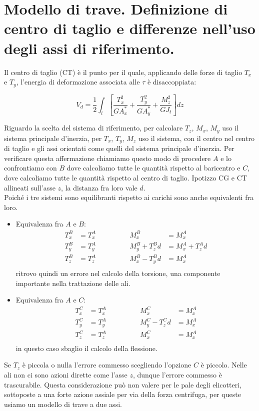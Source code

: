 \section{Modello di trave. Definizione di centro di taglio e differenze nell'uso degli assi di riferimento.}

Il centro di taglio (CT) è il punto per il quale, applicando delle forze di taglio $T_x$ e $T_y$, l'energia di deformazione associata alle $\tau$ è disaccoppiata:

\begin{equation*}
    V_{d}= \frac{1}{2} \int_l 
    \left[
        \frac{T_x^2}{G A^*_x} 
        + \frac{T_y^2}{G A^*_y} 
        + \frac{M_z^2}{G J_t}
    \right] dz
\end{equation*}

Riguardo la scelta del sistema di riferimento, per calcolare $T_z$, $M_x$, $M_y$ uso il sistema principale d'inerzia, per  $T_x$, $T_y$, $M_z$ uso il sistema, con il centro nel centro di taglio e gli assi orientati come quelli del sistema principale d'inerzia. Per verificare questa affermazione chiamiamo questo modo di procedere $A$ e lo confrontiamo con $B$ dove calcoliamo tutte le quantità rispetto al baricentro e $C$, dove calcoliamo tutte le quantità rispetto al centro di taglio. Ipotizzo CG e CT allineati sull'asse $z$, la distanza fra loro vale $d$.\\
Poiché i tre sistemi sono equilibranti rispetto ai carichi sono anche equivalenti fra loro.
\begin{itemize}
    \item Equivalenza fra $A$ e $B$:
    \begin{align*}
        T_x^B &= T_x^A \quad\quad\quad \quad &M_x^B &= M_x^A \\
        T_y^B &= T_y^A \quad\quad\quad \quad &M_y^B + T_z^Bd &= M_x^A+T_z^Ad \\
        T_z^B &= T_z^A \quad\quad\quad \quad &M_x^B -T_y^Bd&= M_x^A \\
    \end{align*}
    ritrovo quindi un errore nel calcolo della torsione, una componente importante nella trattazione delle ali.\\
    \item Equivalenza fra $A$ e $C$:
    \begin{align*}
        T_x^C &= T_x^A \quad\quad\quad \quad &M_x^C &= M_x^A \\
        T_y^C &= T_y^A \quad\quad\quad \quad &M_y^C - T_z^Cd &= M_x^A \\
        T_z^C &= T_z^A \quad\quad\quad \quad &M_x^C &= M_x^A \\
    \end{align*}
    in questo caso sbaglio il calcolo della flessione.\\    
\end{itemize}
Se $T_z$ è piccola o nulla l'errore commesso scegliendo l'opzione $C$ è piccolo. Nelle ali non ci sono azioni dirette come l'asse $z$, dunque l'errore commesso è trascurabile. Questa considerazione può non valere per le pale degli elicotteri, sottoposte a una forte azione assiale per via della forza centrifuga, per queste usiamo un modello di trave a due assi.



